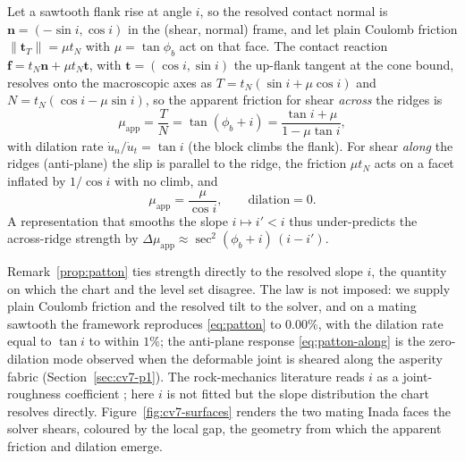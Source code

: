 \documentclass{svjour3}                 %
\newcommand{\norm}[1]{\lVert#1\rVert}
\newcommand{\nbf}{\bm{n}}
\newcommand{\tbf}{\bm{t}}
\newcommand{\fbf}{\bm{f}}
\newcommand{\muapp}{\mu_{\mathrm{app}}}
\begin{document}
\begin{remark}\label{prop:patton}
Let a sawtooth flank rise at angle $i$, so the resolved contact normal is $\nbf=(-\sin i,\cos i)$ in the
(shear, normal) frame, and let plain Coulomb friction $\norm{\tbf_T}=\mu t_N$ with $\mu=\tan\phi_b$ act on that
face. The contact reaction $\fbf=t_N\nbf+\mu t_N\tbf$, with $\tbf=(\cos i,\sin i)$ the up-flank tangent at the
cone bound, resolves onto the macroscopic axes as $T=t_N(\sin i+\mu\cos i)$ and $N=t_N(\cos i-\mu\sin i)$, so
the apparent friction for shear \emph{across} the ridges is
\begin{equation}\label{eq:patton}
\muapp=\frac{T}{N}=\tan(\phi_b+i)=\frac{\tan i+\mu}{1-\mu\tan i},
\end{equation}
with dilation rate $\dot u_n/\dot u_t=\tan i$ (the block climbs the flank). For shear \emph{along} the ridges
(anti-plane) the slip is parallel to the ridge, the friction $\mu t_N$ acts on a facet inflated by $1/\cos i$
with no climb, and
\begin{equation}\label{eq:patton-along}
\muapp=\frac{\mu}{\cos i},\qquad \text{dilation}=0 .
\end{equation}
A representation that smooths the slope $i\mapsto i'<i$ thus under-predicts the across-ridge strength by
$\Delta\muapp\approx\sec^2(\phi_b+i)\,(i-i')$.
\end{remark}

Remark~\ref{prop:patton} ties strength directly to the resolved slope $i$, the quantity on which the chart
and the level set disagree. The law is not imposed: we supply plain Coulomb friction and the resolved tilt
to the solver, and on a mating sawtooth the framework reproduces \eqref{eq:patton} to $0.00\%$, with the
dilation rate equal to $\tan i$ to within $1\%$; the anti-plane response \eqref{eq:patton-along} is the
zero-dilation mode observed when the deformable joint is sheared along the asperity fabric
(Section~\ref{sec:cv7-p1}). The rock-mechanics literature reads $i$ as a joint-roughness coefficient
\citep{barton1977shear,barton1990review}; here $i$ is not fitted but the slope distribution the chart resolves
directly. Figure~\ref{fig:cv7-surfaces} renders the two mating Inada faces the solver shears, coloured by the
local gap, the geometry from which the apparent friction and dilation emerge.
\end{document}
